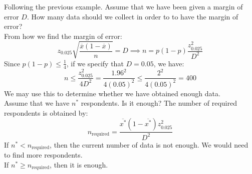 \documentclass{huhtakm-template-book-v2}
\begin{document}
\begin{eg}
	Following the previous example. Assume that we have been given a margin of error $D$. How many data should we collect in order to to have the margin of error?\\
	From how we find the margin of error:
	\begin{equation*}
		z_{0.025}\sqrt{\frac{\overline{x}(1-\overline{x})}{n}}=D\implies n=p(1-p)\frac{z_{0.025}^{2}}{D^{2}}
	\end{equation*}
	Since $p(1-p)\leq\frac{1}{4}$, if we specify that $D=0.05$, we have:
	\begin{equation*}
		n\leq\frac{z_{0.025}^{2}}{4D^{2}}=\frac{1.96^{2}}{4(0.05)^{2}}\leq\frac{2^{2}}{4(0.05)^{2}}=400
	\end{equation*}
	We may use this to determine whether we have obtained enough data.\\
	Assume that we have $n^{*}$ respondents. Is it enough? The number of required respondents is obtained by:
	\begin{equation*}
		n_{\text{required}}=\frac{\overline{x^{*}}(1-\overline{x^{*}})z_{0.025}^{2}}{D^{2}}
	\end{equation*}
	If $n^{*}<n_{\text{required}}$, then the current number of data is not enough. We would need to find more respondents.\\
	If $n^{*}\geq n_{\text{required}}$, then it is enough.
\end{eg}
\end{document}
